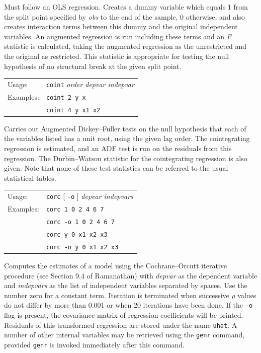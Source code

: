 \documentclass{article}
\begin{document}
{Must follow an OLS regression.  Creates a dummy variable which equals 1
from the split point specified by \textit{obs} to the end of the sample, 0
otherwise, and also creates interaction terms between this dummy and the
original independent variables.  An augmented regression is run including
these terms and an \textit{F} statistic is calculated, taking the augmented
regression as the unrestricted and the original as restricted.  This
statistic is appropriate for testing the null hypothesis of no structural
break at the given split point.


\begin{tabular}{ll}
Usage:      &   \texttt{coint} \textit{order depvar indepvar}\\
Examples:   &   \texttt{coint 2 y x}\\
            &   \texttt{coint 4 y x1 x2}
\end{tabular}

Carries out Augmented Dickey--Fuller tests on the null hypothesis that
each of the variables listed has a unit root, using the given lag
order.  The cointegrating regression is estimated, and an ADF test is
run on the residuals from this regression.  The Durbin--Watson
statistic for the cointegrating regression is also given.  Note that
none of these test statistics can be referred to the usual statistical
tables.


\begin{tabular}{ll}
Usage: & \texttt{corc} [ \texttt{-o} ] \textit{depvar indepvars}  \\
Examples: & \texttt{corc 1 0 2 4 6 7} \\
          &  \texttt{corc -o 1 0 2 4 6 7}\\
          & \texttt{corc y 0 x1 x2 x3} \\
          & \texttt{corc -o y 0 x1 x2 x3}
\end{tabular}

Computes the estimates of a model using the Cochrane--Orcutt iterative
procedure (see Section 9.4 of Ramanathan) with \textit{depvar} as the
dependent variable and \textit{indepvars} as the list of independent
variables separated by spaces.  Use the number zero for a constant
term.  Iteration is terminated when successive $\rho$ values do not
differ by more than 0.001 or when 20 iterations have been done.  If
the \texttt{-o} flag is present, the covariance matrix of regression
coefficients will be printed.  Residuals of this transformed
regression are stored under the name \texttt{uhat}.  A number of other
internal variables may be retrieved using the \texttt{genr} command,
provided \texttt{genr} is invoked immediately after this command.

}
\end{document}
